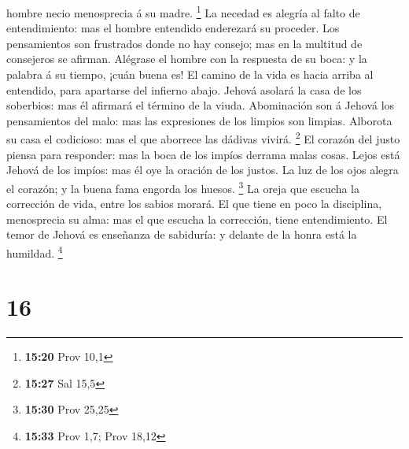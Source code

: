 hombre necio menosprecia á su madre. \footnote{\textbf{15:20} Prov 10,1}
 La necedad es alegría al falto de entendimiento: mas el
hombre entendido enderezará su proceder.  Los
pensamientos son frustrados donde no hay consejo; mas en la multitud de
consejeros se afirman.  Alégrase el hombre con la
respuesta de su boca: y la palabra á su tiempo, ¡cuán buena es!
 El camino de la vida es hacia arriba al entendido, para
apartarse del infierno abajo.  Jehová asolará la casa de
los soberbios: mas él afirmará el término de la viuda. 
Abominación son á Jehová los pensamientos del malo: mas las expresiones
de los limpios son limpias.  Alborota su casa el
codicioso: mas el que aborrece las dádivas vivirá. \footnote{\textbf{15:27}
  Sal 15,5}  El corazón del justo piensa para responder:
mas la boca de los impíos derrama malas cosas.  Lejos
está Jehová de los impíos: mas él oye la oración de los justos.
 La luz de los ojos alegra el corazón; y la buena fama
engorda los huesos. \footnote{\textbf{15:30} Prov 25,25} 
La oreja que escucha la corrección de vida, entre los sabios morará.
 El que tiene en poco la disciplina, menosprecia su alma:
mas el que escucha la corrección, tiene entendimiento. 
El temor de Jehová es enseñanza de sabiduría: y delante de la honra está
la humildad. \footnote{\textbf{15:33} Prov 1,7; Prov 18,12}

\hypertarget{section-15}{%
\section{16}\label{section-15}}

